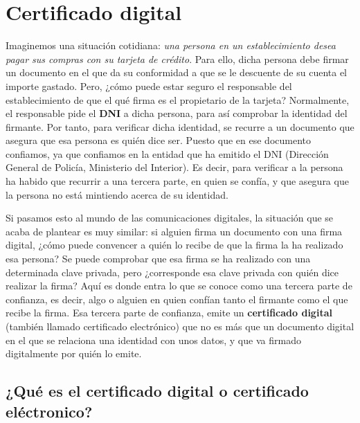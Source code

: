 \documentclass{manual}
\begin{document}
\newpage
\tableofcontents
\thispagestyle{empty}

\newpage
\setcounter{page}{1}




\section{Certificado digital}

Imaginemos una situación cotidiana: \textit{una persona en un establecimiento desea pagar sus compras con su tarjeta de crédito}. Para ello, dicha persona debe firmar un documento en el que da su conformidad a que se le descuente de su cuenta el importe gastado. Pero, ¿cómo puede estar seguro el responsable del establecimiento de que el qué firma es el propietario de la tarjeta? Normalmente, el responsable pide el \textbf{DNI} a dicha persona, para así comprobar la identidad del firmante. Por tanto, para verificar dicha identidad, se recurre a un documento que asegura que esa persona es quién dice ser. Puesto que en ese documento confiamos, ya que confiamos en la entidad que ha emitido el DNI (Dirección General de Policía, Ministerio del Interior). Es decir, para verificar a la persona ha habido que recurrir a una tercera parte, en quien se confía, y que asegura que la persona no está mintiendo acerca de su identidad.

Si pasamos esto al mundo de las comunicaciones digitales, la situación que se acaba de plantear es muy similar: si alguien firma un documento con una firma digital, ¿cómo puede convencer a quién lo recibe de que la firma la ha realizado esa persona? Se puede comprobar que esa firma se ha realizado con una determinada clave privada, pero ¿corresponde esa clave privada con quién dice realizar la firma? Aquí es donde entra lo que se conoce como una tercera parte de confianza, es decir, algo o alguien en quien confían tanto el firmante como el que recibe la firma. Esa tercera parte de confianza, emite un \textbf{certificado digital} (también llamado certificado electrónico) que no es más que un documento digital en el que se relaciona una identidad con unos datos, y que va firmado digitalmente por quién lo emite.


\subsection{¿Qué es el certificado digital o certificado eléctronico?}
\end{document}
